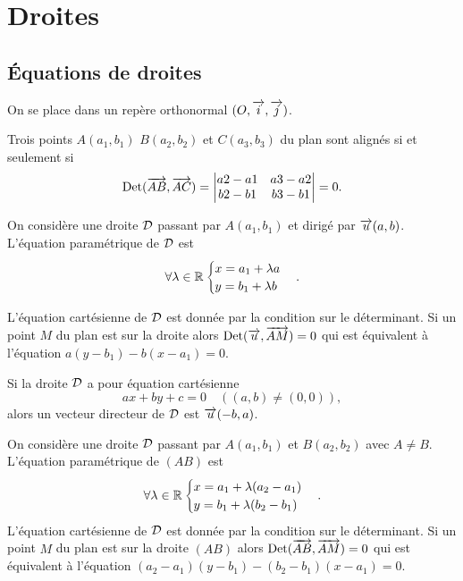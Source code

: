 \section{Droites}
\label{sec:droites}

\subsection{Équations de droites}

On se place dans un repère orthonormal \((O , \overrightarrow{i} , \overrightarrow{j})\).
\begin{prop}
    Trois points \(A(a_1, b_1)\) \(B(a_2, b_2)\) et \(C(a_3, b_3)\) du plan sont 
    alignés si et seulement si
    \begin{equation}
        \operatorname{Det}(\overrightarrow{AB},\overrightarrow{AC})=
        \begin{vmatrix}
            a2 - a1&a3 - a2\\
            b2 - b1&b3 - b1
        \end{vmatrix} =0.
    \end{equation}
\end{prop}

\begin{prop}
    On considère une droite \(\mathcal{D}\) passant par \(A(a_1 , b_1)\) et dirigé par 
    \(\overrightarrow{u}(a , b)\). L'équation paramétrique de \(\mathcal{D}\) est
    \begin{equation}
        \forall \lambda \in \mathbb{R} \begin{cases} x = a_1 + \lambda a \\ y = b_1+ 
        \lambda b\end{cases}.
    \end{equation}

    L'équation cartésienne de \(\mathcal{D}\) est donnée par la condition sur le 
    déterminant. Si un point \(M\) du plan est sur la droite alors 
    \(\operatorname{Det}(\overrightarrow{u} , \overrightarrow{AM}) = 0\) qui est équivalent à l'équation 
    \(a(y - b_1)-b(x - a_1) = 0\).
\end{prop}

Si la droite \(\mathcal{D}\) a pour équation cartésienne
\begin{equation}
    ax + by + c = 0 \quad ((a , b) \neq (0 , 0)),
\end{equation}
alors un vecteur directeur de \(\mathcal{D}\) est \(\overrightarrow{u}(-b , a)\).

\begin{prop}
    On considère une droite \(\mathcal{D}\) passant par \(A(a_1 , b_1)\) et \(B(a_2 , b_2)\) 
    avec \(A \neq B\). L'équation paramétrique de \((AB)\) est
    \begin{equation}
        \forall \lambda \in \mathbb{R} \begin{cases} x = a_1 + \lambda (a_2 - a_1) \\ y = 
        b_1+ \lambda (b_2 - b_1)\end{cases}.
    \end{equation}
    L'équation cartésienne de \(\mathcal{D}\) est donnée par la condition sur le 
    déterminant. Si un point \(M\) du plan est sur la droite \((AB)\) alors 
    \(\operatorname{Det}(\overrightarrow{AB},\overrightarrow{AM}) = 0\) qui est équivalent à l'équation 
    \((a_2 - a_1)(y - b_1)-(b_2 - b_1)(x - a_1) = 0\).
\end{prop}

